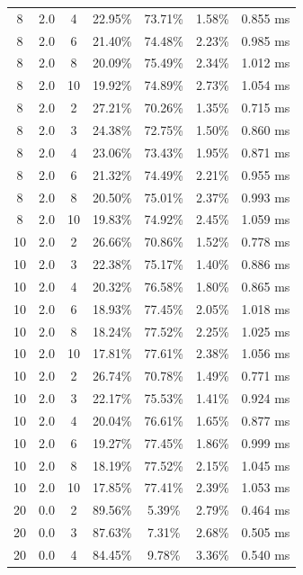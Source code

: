 \documentclass[11pt,a4paper]{article}
\begin{document}
\begin{longtable}{ccccccc}
        8 & 2.0 & 4 & 22.95\% & 73.71\% & 1.58\% & 0.855 ms \\
        8 & 2.0 & 6 & 21.40\% & 74.48\% & 2.23\% & 0.985 ms \\
        8 & 2.0 & 8 & 20.09\% & 75.49\% & 2.34\% & 1.012 ms \\
        8 & 2.0 & 10 & 19.92\% & 74.89\% & 2.73\% & 1.054 ms \\
        8 & 2.0 & 2 & 27.21\% & 70.26\% & 1.35\% & 0.715 ms \\
        8 & 2.0 & 3 & 24.38\% & 72.75\% & 1.50\% & 0.860 ms \\
        8 & 2.0 & 4 & 23.06\% & 73.43\% & 1.95\% & 0.871 ms \\
        8 & 2.0 & 6 & 21.32\% & 74.49\% & 2.21\% & 0.955 ms \\
        8 & 2.0 & 8 & 20.50\% & 75.01\% & 2.37\% & 0.993 ms \\
        8 & 2.0 & 10 & 19.83\% & 74.92\% & 2.45\% & 1.059 ms \\
        \midrule
        10 & 2.0 & 2 & 26.66\% & 70.86\% & 1.52\% & 0.778 ms \\
        10 & 2.0 & 3 & 22.38\% & 75.17\% & 1.40\% & 0.886 ms \\
        10 & 2.0 & 4 & 20.32\% & 76.58\% & 1.80\% & 0.865 ms \\
        10 & 2.0 & 6 & 18.93\% & 77.45\% & 2.05\% & 1.018 ms \\
        10 & 2.0 & 8 & 18.24\% & 77.52\% & 2.25\% & 1.025 ms \\
        10 & 2.0 & 10 & 17.81\% & 77.61\% & 2.38\% & 1.056 ms \\
        10 & 2.0 & 2 & 26.74\% & 70.78\% & 1.49\% & 0.771 ms \\
        10 & 2.0 & 3 & 22.17\% & 75.53\% & 1.41\% & 0.924 ms \\
        10 & 2.0 & 4 & 20.04\% & 76.61\% & 1.65\% & 0.877 ms \\
        10 & 2.0 & 6 & 19.27\% & 77.45\% & 1.86\% & 0.999 ms \\
        10 & 2.0 & 8 & 18.19\% & 77.52\% & 2.15\% & 1.045 ms \\
        10 & 2.0 & 10 & 17.85\% & 77.41\% & 2.39\% & 1.053 ms \\
        \midrule
        20 & 0.0 & 2 & 89.56\% & 5.39\% & 2.79\% & 0.464 ms \\
        20 & 0.0 & 3 & 87.63\% & 7.31\% & 2.68\% & 0.505 ms \\
        20 & 0.0 & 4 & 84.45\% & 9.78\% & 3.36\% & 0.540 ms \\

\end{longtable}
\end{document}

